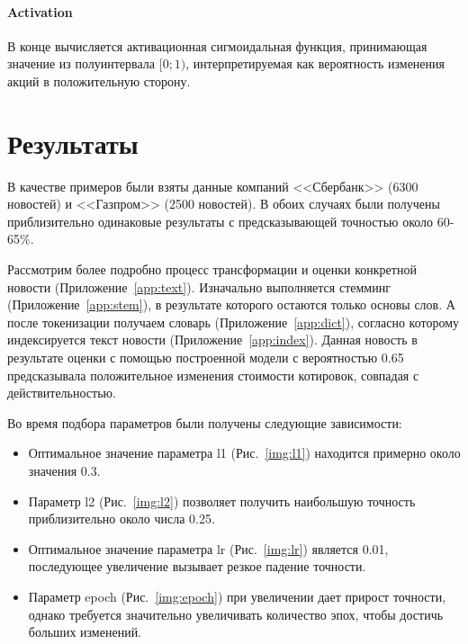 \documentclass[14pt]{matmex-diploma-custom}
\begin{document}
\paragraph{Activation}

В конце вычисляется активационная сигмоидальная функция, принимающая значение из полуинтервала $[0;1)$, интерпретируемая как вероятность изменения акций в положительную сторону.

\clearpage\section{Результаты}

В качестве примеров были взяты данные компаний <<Сбербанк>> (6300 новостей) и <<Газпром>> (2500 новостей). В обоих случаях были получены приблизительно одинаковые результаты с предсказывающей точностью около 60-65\%.

Рассмотрим более подробно процесс трансформации и оценки конкретной новости (Приложение~\ref{app:text}). Изначально выполняется стемминг (Приложение~\ref{app:stem}), в результате которого остаются только основы слов. А после токенизации получаем словарь (Приложение~\ref{app:dict}), согласно которому индексируется текст новости (Приложение~\ref{app:index}). Данная новость в результате оценки с помощью построенной модели с вероятностью 0.65 предсказывала положительное изменения стоимости котировок, совпадая с действительностью.

Во время подбора параметров были получены следующие зависимости:

\begin{itemize}
\item Оптимальное значение параметра l1 (Рис.~\ref{img:l1}) находится примерно около значения 0.3.
\item Параметр l2 (Рис.~\ref{img:l2}) позволяет получить наибольшую точность приблизительно около числа 0.25.
\item Оптимальное значение параметра lr (Рис.~\ref{img:lr}) является 0.01, последующее увеличение вызывает резкое падение точности.
\item Параметр epoch (Рис.~\ref{img:epoch}) при увеличении дает прирост точности, однако требуется значительно увеличивать количество эпох, чтобы достичь больших изменений.
\end{itemize}
\end{document}

